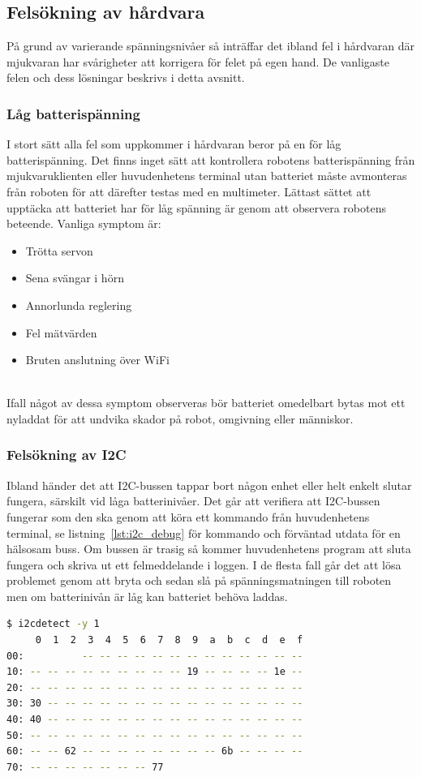 \documentclass{article}
\begin{document}
\subsection{Felsökning av hårdvara}
På grund av varierande spänningsnivåer så inträffar det ibland fel i hårdvaran där mjukvaran har svårigheter att korrigera för felet på egen hand. De vanligaste felen och dess lösningar beskrivs i detta avsnitt.

\subsubsection{Låg batterispänning}
I stort sätt alla fel som uppkommer i hårdvaran beror på en för låg batterispänning. Det finns inget sätt att kontrollera robotens batterispänning från mjukvaruklienten eller huvudenhetens terminal utan batteriet måste avmonteras från roboten för att därefter testas med en multimeter. Lättast sättet att upptäcka att batteriet har för låg spänning är genom att observera robotens beteende. Vanliga symptom är:

\begin{itemize}
    \item Trötta servon
    \item Sena svängar i hörn
    \item Annorlunda reglering
    \item Fel mätvärden
    \item Bruten anslutning över WiFi
\end{itemize}
\ \\
Ifall något av dessa symptom observeras bör batteriet omedelbart bytas mot ett nyladdat för att undvika skador på robot, omgivning eller människor.

\subsubsection{Felsökning av I2C}
Ibland händer det att I2C-bussen tappar bort någon enhet eller helt enkelt slutar fungera, särskilt vid låga batterinivåer. Det går att verifiera att I2C-bussen fungerar som den ska genom att köra ett kommando från huvudenhetens terminal, se listning~\ref{lst:i2c_debug} för kommando och förväntad utdata för en hälsosam buss. Om bussen är trasig så kommer huvudenhetens program att sluta fungera och skriva ut ett felmeddelande i loggen. I de flesta fall går det att lösa problemet genom att bryta och sedan slå på spänningsmatningen till roboten men om batterinivån är låg kan batteriet behöva laddas.
\newline
\begin{lstlisting}[language=sh, label={lst:i2c_debug}, caption={Kommando och förväntad utdata för en fungerande I2C-buss}]
$ i2cdetect -y 1
     0  1  2  3  4  5  6  7  8  9  a  b  c  d  e  f
00:          -- -- -- -- -- -- -- -- -- -- -- -- --
10: -- -- -- -- -- -- -- -- -- 19 -- -- -- -- 1e --
20: -- -- -- -- -- -- -- -- -- -- -- -- -- -- -- --
30: 30 -- -- -- -- -- -- -- -- -- -- -- -- -- -- --
40: 40 -- -- -- -- -- -- -- -- -- -- -- -- -- -- --
50: -- -- -- -- -- -- -- -- -- -- -- -- -- -- -- --
60: -- -- 62 -- -- -- -- -- -- -- -- 6b -- -- -- --
70: -- -- -- -- -- -- -- 77
\end{lstlisting}
\end{document}
